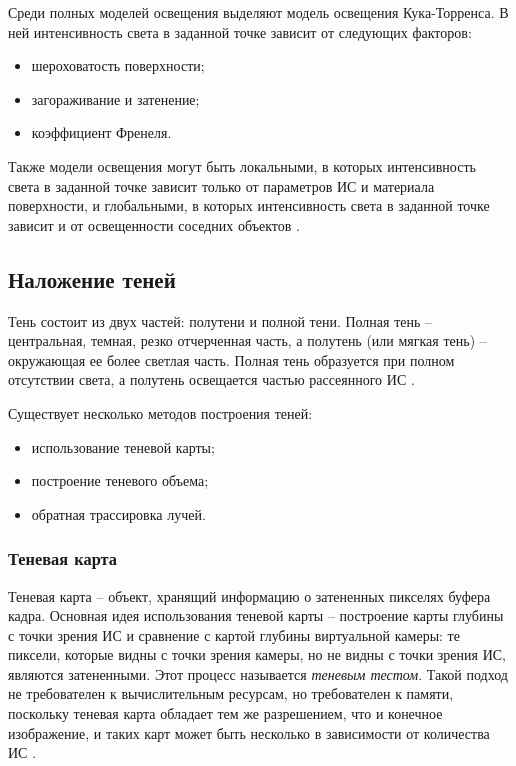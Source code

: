 Среди полных моделей освещения выделяют модель освещения Кука-Торренса. В ней интенсивность света в заданной точке зависит от следующих факторов:

\begin{itemize}
	\item шероховатость поверхности;
	\item загораживание и затенение;
	\item коэффициент Френеля.
\end{itemize}

Также модели освещения могут быть локальными, в которых интенсивность света в заданной точке зависит только от параметров ИС и материала поверхности, и глобальными, в которых интенсивность света в заданной точке зависит и от освещенности соседних объектов \cite{rogers}.

\subsection{Наложение теней}

Тень состоит из двух частей: полутени и полной тени. Полная тень -- центральная, темная, резко отчерченная часть, а полутень (или мягкая тень) -- окружающая ее более светлая часть. Полная тень образуется при полном отсутствии света, а полутень освещается частью рассеянного ИС \cite{rogers}.

Существует несколько методов построения теней:

\begin{itemize}
	\item использование теневой карты;
	\item построение теневого объема;
	\item обратная трассировка лучей.
\end{itemize}

\subsubsection*{Теневая карта}

Теневая карта -- объект, хранящий информацию о затененных пикселях буфера кадра. Основная идея использования теневой карты -- построение карты глубины с точки зрения ИС и сравнение с картой глубины виртуальной камеры: те пиксели, которые видны с точки зрения камеры, но не видны с точки зрения ИС, являются затененными. Этот процесс называется \textit{теневым тестом}. Такой подход не требователен к вычислительным ресурсам, но требователен к памяти, поскольку теневая карта обладает тем же разрешением, что и конечное изображение, и таких карт может быть несколько в зависимости от количества ИС \cite{engel2008programming}.

